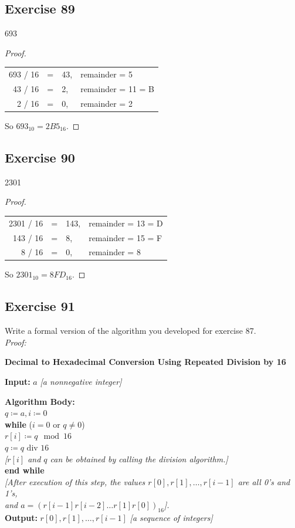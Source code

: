 \documentclass[14pt]{extarticle}
\newcommand{\cy}{\color{cyan}}
\begin{document}
\subsection{Exercise 89}
693
\begin{proof}
\begin{center}
\begin{tabular}{rcll}
693 / 16 & = & 43, & remainder = 5 \\
43 / 16 & = & 2, & remainder = 11 = B \\
2 / 16 & = & 0, & remainder = 2
\end{tabular}
\end{center}
So $693_{10} = 2B5_{16}$.
\end{proof}

\subsection{Exercise 90}
2301
\begin{proof}
\begin{center}
\begin{tabular}{rcll}
2301 / 16 & = & 143, & remainder = 13 = D \\
143 / 16 & = & 8, & remainder = 15 = F \\
8 / 16 & = & 0, & remainder = 8
\end{tabular}
\end{center}
So $2301_{10} = 8FD_{16}$.
\end{proof}

\subsection{Exercise 91}
Write a formal version of the algorithm you developed for exercise 87.\\
{\it Proof:}
\begin{tcolorbox}[colframe=cyan]
{\bf \cy Decimal to Hexadecimal Conversion Using Repeated Division by 16} 

{\bf \cy Input:} $a$ {\it[a nonnegative integer]}

\begin{tabbing}
{\bf\cy Alg}\={\bf\cy orithm Body:} \\
         \> $q \coloneqq a, i \coloneqq 0$ \\
         \> {\bf wh}\={\bf ile} ($i = 0$ or $q \neq 0$) \\
         \>          \> $r[i] \coloneqq q \mod 16$ \\
         \>          \> $q \coloneqq q \text{ div } 16$ \\
         \>          \> {\it [$r[i]$ and $q$ can be obtained by calling the division algorithm.]} \\
         \> {\bf end while} \\
         \> {\it [After execution of this step, the values $r[0], r[1], \ldots, r[i-1]$ are all 0's and 1's,} \\ 
         \> {\it and $a = (r[i-1] r[i-2] \ldots r[1] r[0])_{16}$].} \\
{\bf\cy Output:} $r[0], r[1], \ldots, r[i-1] $ {\it [a sequence of integers]}
\end{tabbing}
\end{tcolorbox}
\end{document}
